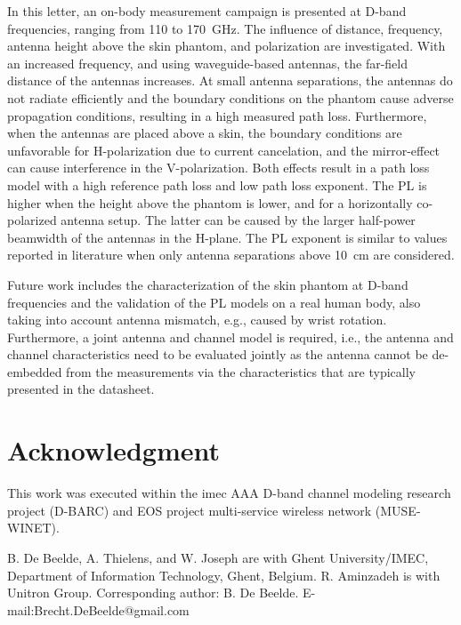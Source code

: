 \documentclass[preprint]{rsl}
\begin{document}
In this letter, an on-body measurement campaign is presented at D-band frequencies, ranging from 110 to 170~GHz. 
The influence of distance, frequency, antenna height above the skin phantom, and polarization are investigated.
With an increased frequency, and using waveguide-based antennas, the far-field distance of the antennas increases. 
At small antenna separations, the antennas do not radiate efficiently and the boundary conditions on the phantom cause adverse propagation conditions, resulting in a high measured path loss. 
Furthermore, when the antennas are placed above a skin, the boundary conditions are unfavorable for H-polarization due to current cancelation, and the mirror-effect can cause interference in the V-polarization.
Both effects result in a path loss model with a high reference path loss and low path loss exponent.
The PL is higher when the height above the phantom is lower, and for a horizontally co-polarized antenna setup. 
The latter can be caused by the larger half-power beamwidth of the antennas in the H-plane.
The PL exponent is similar to values reported in literature when only antenna separations above 10~cm are considered.

Future work includes the characterization of the skin phantom at D-band frequencies and the validation of the PL models on a real human body, also taking into account antenna mismatch, e.g., caused by wrist rotation.
Furthermore, a joint antenna and channel model is required, i.e., the antenna and channel characteristics need to be evaluated jointly as the antenna cannot be de-embedded from the measurements via the characteristics that are typically presented in the datasheet.

\section{Acknowledgment}

This work was executed within the imec AAA D-band channel modeling research project (D-BARC) and EOS project multi-service wireless network (MUSE-WINET). 

\vspace{3pt}

\suppressfloats


\suppressfloats

\vspace{7pt}

%
%
\noindent\small
B. De Beelde, A. Thielens, and W. Joseph are with Ghent University/IMEC, Department of Information Technology, Ghent, Belgium. 
R. Aminzadeh is with Unitron Group. 
Corresponding author: B. De Beelde. 
E-mail:Brecht.DeBeelde@gmail.com
\end{document}
